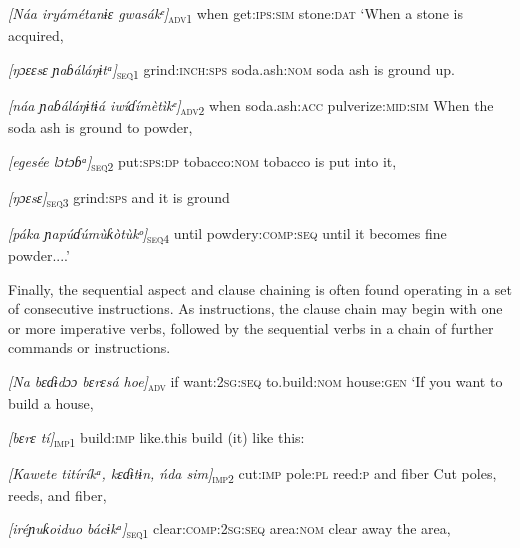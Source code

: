 \begin{table}
\textit{[Náa   iryámétanɨɛ   gwasákᵉ]}\textsc{\textsubscript{adv1}}
when   get:\textsc{ips:sim}   stone:\textsc{dat}
‘When a stone is acquired,



\textit{[ŋɔɛ}\textit{ɛsɛ}\textit{     ɲaɓáláŋɨtᵃ]}\textsc{\textsubscript{seq1}}
grind:\textsc{inch:sps}   soda.ash:\textsc{nom}
soda ash is ground up.



\textit{[náa   ɲaɓáláŋɨtɨá     iwíɗímètìkᵉ]}\textsc{\textsubscript{adv2}}
when   soda.ash:\textsc{acc}   pulverize:\textsc{mid:sim}
When the soda ash is ground to powder,



\textit{[eg}\textit{esé}\textit{e   lɔtɔɓᵃ]}\textsc{\textsubscript{seq2}}
put:\textsc{sps:dp}   tobacco:\textsc{nom}
tobacco is put into it,



\textit{[ŋɔ}\textit{ɛsɛ}\textit{]}\textsc{\textsubscript{seq3}}
grind:\textsc{sps}
and it is ground



\textit{[páka ɲapúɗúmùƙòtù}\textit{kᵒ}\textit{]}\textsc{\textsubscript{seq4}}
until powdery:\textsc{comp:seq}
until it becomes fine powder....’


Finally, the sequential aspect and clause chaining is often found operating in a set of consecutive instructions. As instructions, the clause chain may begin with one or more imperative verbs, followed by the sequential verbs in a chain of further commands or instructions.



\textit{[Na   bɛɗɨdɔɔ     bɛrɛsá   hoe]}\textsc{\textsubscript{adv}}
if   want:\textsc{2sg:seq}   to.build:\textsc{nom}  house:\textsc{gen}
‘If you want to build a house,



\textit{[bɛrɛ     tí]}\textsc{\textsubscript{imp1}}
build:\textsc{imp}   like.this
build (it) like this:



\textit{[Kawete   titíríkᵃ,   kɛɗɨtɨn,   ńda   sim]}\textsc{\textsubscript{imp2}}
cut:\textsc{imp}   pole:\textsc{pl}   reed:\textsc{p    }and   fiber
Cut poles, reeds, and fiber,



\textit{[iréɲuƙoidu}\textit{o}\textit{     bácɨkᵃ]}\textsc{\textsubscript{seq1}}
clear:\textsc{comp:2sg:seq}   area:\textsc{nom}
clear away the area,




\end{table}
